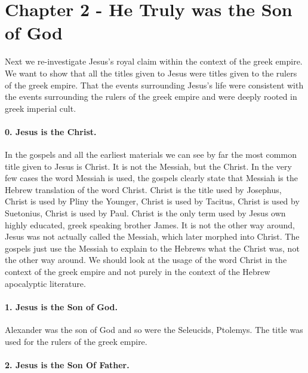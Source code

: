 \section{Chapter 2 - He Truly was the Son of God}\label{par:chapter-2---he-truly-was-the-son-of-god}

Next we re-investigate Jesus's royal claim within the context of the greek empire.
We want to show that all the titles given to Jesus were titles given to the rulers of the greek empire.
That the events surrounding Jesus's life were consistent with the events surrounding the rulers of the greek empire and were deeply rooted in greek imperial cult.

\paragraph{0.
Jesus is the Christ.}\label{par:jesus-is-the-christ.}

In the gospels and all the earliest materials we can see by far the most common title given to Jesus is Christ.
It is not the Messiah, but the Christ.
In the very few cases the word Messiah is used, the gospels clearly state that Messiah is the Hebrew translation of the word Christ.
Christ is the title used by Josephus, Christ is used by Pliny the Younger, Christ is used by Tacitus, Christ is used by Suetonius, Christ is used by Paul.
Christ is the only term used by Jesus own highly educated, greek speaking brother James.
It is not the other way around, Jesus was not actually called the Messiah, which later morphed into Christ.
The gospels just use the Messiah to explain to the Hebrews what the Christ was, not the other way around.
We should look at the usage of the word Christ in the context of the greek empire and not purely in the context of the Hebrew apocalyptic literature.

\paragraph{1.
Jesus is the Son of God.}\label{par:jesus-is-the-son-of-god.}

Alexander was the son of God and so were the Seleucids, Ptolemys.
The title was used for the rulers of the greek empire.

\paragraph{2.
Jesus is the Son Of Father.}\label{par:jesus-is-the-son-of-father.}

